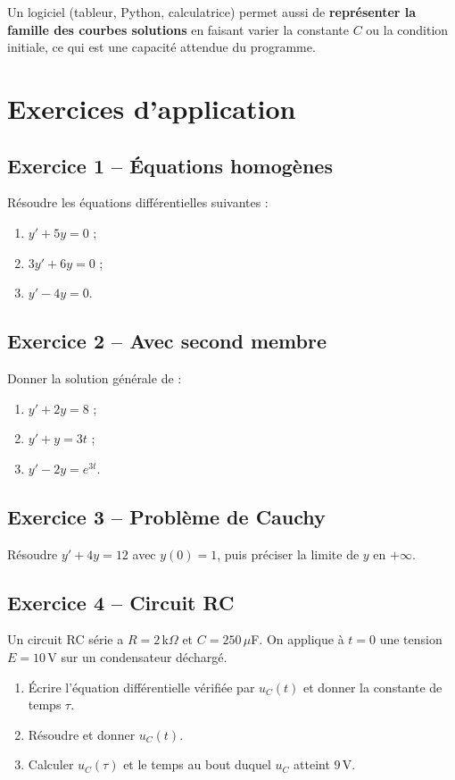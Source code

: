 \documentclass[a4paper,11pt]{article}
\begin{document}
\begin{remarque}
Un logiciel (tableur, Python, calculatrice) permet aussi de \textbf{représenter la famille des courbes solutions} en faisant varier la constante $C$ ou la condition initiale, ce qui est une capacité attendue du programme.
\end{remarque}

\newpage
\section{Exercices d'application}

\subsection*{Exercice 1 -- Équations homogènes}
Résoudre les équations différentielles suivantes :
\begin{enumerate}[label=\alph*)]
  \item $y' + 5y = 0$ ;
  \item $3y' + 6y = 0$ ;
  \item $y' - 4y = 0$.
\end{enumerate}

\subsection*{Exercice 2 -- Avec second membre}
Donner la solution générale de :
\begin{enumerate}[label=\alph*)]
  \item $y' + 2y = 8$ ;
  \item $y' + y = 3t$ ;
  \item $y' - 2y = e^{3t}$.
\end{enumerate}

\subsection*{Exercice 3 -- Problème de Cauchy}
Résoudre $y' + 4y = 12$ avec $y(0) = 1$, puis préciser la limite de $y$ en $+\infty$.

\subsection*{Exercice 4 -- Circuit RC}
Un circuit RC série a $R = 2\,$k$\Omega$ et $C = 250\,\mu$F. On applique à $t = 0$ une tension $E = 10\,$V sur un condensateur déchargé.
\begin{enumerate}[label=\alph*)]
  \item Écrire l'équation différentielle vérifiée par $u_C(t)$ et donner la constante de temps $\tau$.
  \item Résoudre et donner $u_C(t)$.
  \item Calculer $u_C(\tau)$ et le temps au bout duquel $u_C$ atteint $9\,$V.
\end{enumerate}
\end{document}
